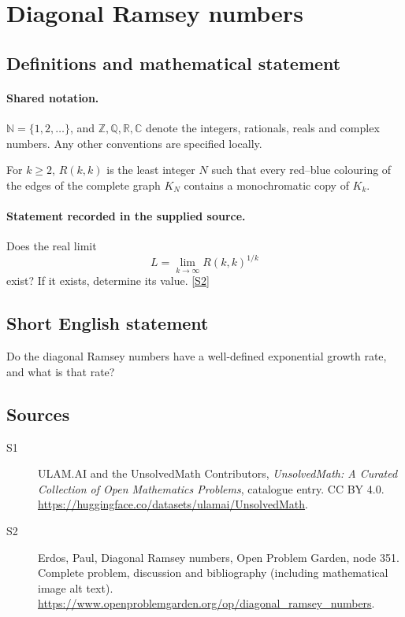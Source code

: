 \documentclass[11pt]{book}
\newcommand{\sref}[2]{\hyperlink{source:#1:#2}{[S#2]}}
\begin{document}
\section{Diagonal Ramsey numbers}\label{statement}

\subsection{Definitions and mathematical statement}

\paragraph{Shared notation.}$\mathbb N=\{1,2,\ldots\}$, and $\mathbb Z,\mathbb Q,\mathbb R,\mathbb C$ denote the integers, rationals, reals and complex numbers. Any other conventions are specified locally.


For $k\geq2$, $R(k,k)$ is the least integer $N$ such that every red--blue colouring of the edges of the complete graph $K_N$ contains a monochromatic copy of $K_k$.
\paragraph{Statement recorded in the supplied source.}
Does the real limit
\[L=\lim_{k\to\infty}R(k,k)^{1/k}\]
exist? If it exists, determine its value. \sref{statement}{2}
\subsection{Short English statement}
Do the diagonal Ramsey numbers have a well-defined exponential growth rate, and what is that rate?
\subsection{Sources}
\begin{description}
\item[\hypertarget{source:statement:1}{S1}] ULAM.AI and the UnsolvedMath Contributors, \emph{UnsolvedMath: A Curated Collection of Open Mathematics Problems}, catalogue entry. CC BY 4.0. \url{https://huggingface.co/datasets/ulamai/UnsolvedMath}.
\item[\hypertarget{source:statement:2}{S2}] Erdos, Paul, Diagonal Ramsey numbers, Open Problem Garden, node 351. Complete problem, discussion and bibliography (including mathematical image alt text). \url{https://www.openproblemgarden.org/op/diagonal_ramsey_numbers}.
\end{description}
\label{end:statement}
\end{document}
